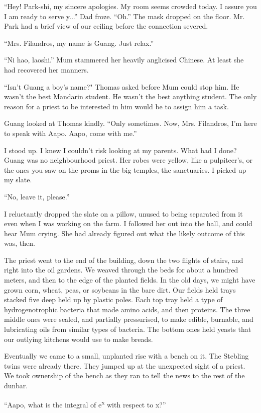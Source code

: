 ``Hey! Park-shi, my sincere apologies. My room seems crowded today. I assure you I am ready to serve y...'' Dad froze. ``Oh.'' The mask dropped on the floor. Mr. Park had a brief view of our ceiling before the connection severed.

``Mrs. Filandros, my name is Guang. Just relax.''

``Ni hao, laoshi.'' Mum stammered her heavily anglicised Chinese. At least she had recovered her manners.

``Isn't Guang a boy's name?" Thomas asked before Mum could stop him. He wasn't the best Mandarin student. He wasn't the best anything student. The only reason for a priest to be interested in him would be to assign him a task.

Guang looked at Thomas kindly. ``Only sometimes. Now, Mrs. Filandros, I'm here to speak with Aapo. Aapo, come with me.''

I stood up. I knew I couldn't risk looking at my parents. What had I done? Guang was no neighbourhood priest. Her robes were yellow, like a pulpiteer's, or the ones you saw on the proms in the big temples, the sanctuaries. I picked up my slate.

``No, leave it, please.''

I reluctantly dropped the slate on a pillow, unused to being separated from it even when I was working on the farm. I followed her out into the hall, and could hear Mum crying. She had already figured out what the likely outcome of this was, then.

The priest went to the end of the building, down the two flights of stairs, and right into the oil gardens. We weaved through the beds for about a hundred meters, and then to the edge of the planted fields. In the old days, we might have grown corn, wheat, peas, or soybeans in the bare dirt. Our fields held trays stacked five deep held up by plastic poles. Each top tray held a type of hydrogenotrophic bacteria that made amino acids, and then proteins. The three middle ones were sealed, and partially pressurised, to make edible, burnable, and lubricating oils from similar types of bacteria. The bottom ones held yeasts that our outlying kitchens would use to make breads.

Eventually we came to a small, unplanted rise with a bench on it. The Stebling twins were already there. They jumped up at the unexpected sight of a priest. We took ownership of the bench as they ran to tell the news to the rest of the dunbar.

``Aapo, what is the integral of e\textsuperscript{x} with respect to x?''

